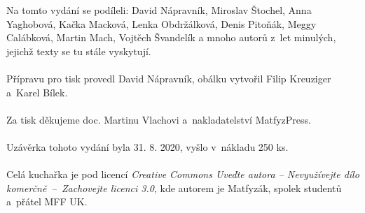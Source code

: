 \setcounter{page}{0}
\tableofcontents
{}
\vspace*{\fill}
\noindent Na tomto vydání se podíleli:
David Nápravník,
Miroslav Štochel,
Anna Yaghobová,
Kačka Macková,
Lenka Obdržálková,
Denis Pitoňák,
Meggy Calábková,
Martin Mach,
Vojtěch Švandelík
a mnoho autorů z~let minulých, jejichž texty se tu stále vyskytují.
\\\\
Přípravu pro tisk provedl David Nápravník,
obálku vytvořil Filip Kreuziger a~Karel Bílek.
\\\\
Za tisk děkujeme doc. Martinu Vlachovi a~nakladatelství MatfyzPress.
\\\\
Uzávěrka tohoto vydání byla 31. 8. 2020, vyšlo v~nákladu 250 ks.
\\\\
Celá kuchařka je pod licencí \textit{Creative Commons Uveďte autora --
Nevyužívejte dílo komerčně~--~Zachovejte licenci 3.0}, kde autorem je Matfyzák,
spolek studentů a~přátel MFF UK.
\newpage
{}